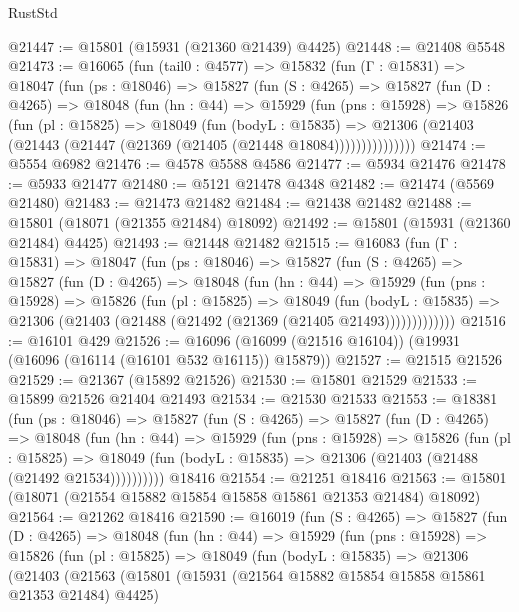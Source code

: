 \begin{lexlean}{RustStd}
\begin{coremodule}
@21447 := @15801 (@15931 (@21360 @21439) @4425)
@21448 := @21408 @5548
@21473 := @16065
    (fun (tail0 : @4577) =>
    @15832
      (fun (Γ : @15831) =>
      @18047
        (fun (ps : @18046) =>
        @15827
          (fun (S : @4265) =>
          @15827
            (fun (D : @4265) =>
            @18048
              (fun (hn : @44) =>
              @15929
                (fun (pns : @15928) =>
                @15826
                  (fun (pl : @15825) =>
                  @18049
                    (fun (bodyL : @15835) =>
                    @21306 (@21403 (@21443 (@21447 (@21369 (@21405 (@21448 @18084)))))))))))))))
@21474 := @5554 @6982
@21476 := @4578 @5588 @4586
@21477 := @5934 @21476
@21478 := @5933 @21477
@21480 := @5121 @21478 @4348
@21482 := @21474 (@5569 @21480)
@21483 := @21473 @21482
@21484 := @21438 @21482
@21488 := @15801 (@18071 (@21355 @21484) @18092)
@21492 := @15801 (@15931 (@21360 @21484) @4425)
@21493 := @21448 @21482
@21515 := @16083
    (fun (Γ : @15831) =>
    @18047
      (fun (ps : @18046) =>
      @15827
        (fun (S : @4265) =>
        @15827
          (fun (D : @4265) =>
          @18048
            (fun (hn : @44) =>
            @15929
              (fun (pns : @15928) =>
              @15826
                (fun (pl : @15825) =>
                @18049
                  (fun (bodyL : @15835) =>
                  @21306 (@21403 (@21488 (@21492 (@21369 (@21405 @21493)))))))))))))
@21516 := @16101 @429
@21526 := @16096 (@16099 (@21516 @16104)) (@19931 (@16096 (@16114 (@16101 @532 @16115)) @15879))
@21527 := @21515 @21526
@21529 := @21367 (@15892 @21526)
@21530 := @15801 @21529
@21533 := @15899 @21526 @21404 @21493
@21534 := @21530 @21533
@21553 := @18381
    (fun (ps : @18046) =>
    @15827
      (fun (S : @4265) =>
      @15827
        (fun (D : @4265) =>
        @18048
          (fun (hn : @44) =>
          @15929
            (fun (pns : @15928) =>
            @15826
              (fun (pl : @15825) =>
              @18049 (fun (bodyL : @15835) => @21306 (@21403 (@21488 (@21492 @21534))))))))))
    @18416
@21554 := @21251 @18416
@21563 := @15801 (@18071 (@21554 @15882 @15854 @15858 @15861 @21353 @21484) @18092)
@21564 := @21262 @18416
@21590 := @16019
    (fun (S : @4265) =>
    @15827
      (fun (D : @4265) =>
      @18048
        (fun (hn : @44) =>
        @15929
          (fun (pns : @15928) =>
          @15826
            (fun (pl : @15825) =>
            @18049
              (fun (bodyL : @15835) =>
              @21306
                (@21403
                  (@21563
                    (@15801
                      (@15931 (@21564 @15882 @15854 @15858 @15861 @21353 @21484) @4425)

\end{coremodule}
\end{lexlean}
